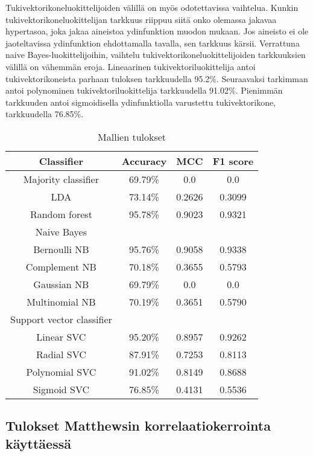 \documentclass[finnish,twoside,openright]{HYgraduMLDS}
\begin{document}
Tukivektorikoneluokittelijoiden välillä on myös odotettavissa vaihtelua. Kunkin tukivektorikoneluokittelijan tarkkuus riippuu siitä onko olemassa jakavaa hypertasoa, joka jakaa aineistoa ydinfunktion muodon mukaan. Jos aineisto ei ole jaoteltavissa ydinfunktion ehdottamalla tavalla, sen tarkkuus kärsii. Verrattuna naive Bayes-luokittelijoihin, vaihtelu tukivektorikoneluokittelijoiden tarkkuuksien välillä on vähemmän eroja. Lineaarinen tukivektoriluokittelija antoi tukivektorikoneista parhaan tuloksen tarkkuudella 95.2\%. Seuraavaksi tarkimman antoi polynominen tukivektoriluokittelija tarkkuudella 91.02\%. Pienimmän tarkkuuden antoi sigmoidisella ydinfunktiolla varustettu tukivektorikone, tarkkuudella 76.85\%.

\begin{table}
    \centering
    \begin{tabular}{||c | c c c||} 
        \hline
        Classifier & Accuracy & MCC & F1 score \\ [0.5ex] 
        \hline\hline
        Majority classifier & 69.79\% & 0.0 & 0.0 \\ 
        \hline
        LDA & 73.14\% & 0.2626 & 0.3099 \\
        \hline
        Random forest & 95.78\% & 0.9023 & 0.9321 \\
        \hline
        \hline
        Naive Bayes & & & \\
        \hline
        Bernoulli NB & 95.76\% & 0.9058 & 0.9338 \\
        Complement NB & 70.18\% & 0.3655 & 0.5793 \\
        Gaussian NB & 69.79\% & 0.0 & 0.0 \\
        Multinomial NB & 70.19\% & 0.3651 & 0.5790 \\
        \hline
        \hline
        Support vector classifier & & & \\
        \hline
        Linear SVC & 95.20\% & 0.8957 & 0.9262 \\
        Radial SVC & 87.91\% & 0.7253 & 0.8113 \\
        Polynomial SVC & 91.02\% & 0.8149 & 0.8688 \\
        Sigmoid SVC & 76.85\% & 0.4131 & 0.5536 \\
        \hline
    \end{tabular}
    \caption{Mallien tulokset}
    \label{table:results}
\end{table}


\subsection{Tulokset Matthewsin korrelaatiokerrointa käyttäessä}
\end{document}
